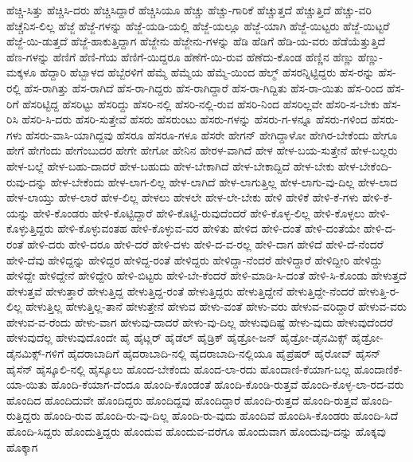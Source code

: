 {ಹೆಚ್ಚಿ-ಸಿತ್ತು
ಹೆಚ್ಚಿಸಿ-ದರು
ಹೆಚ್ಚಿಸಿದ್ದಾರೆ
ಹೆಚ್ಚಿಸಿಯೂ
ಹೆಚ್ಚು
ಹೆಚ್ಚು-ಗಾರಿಕೆ
ಹೆಚ್ಚುತ್ತದೆ
ಹೆಚ್ಚುತ್ತಿದೆ
ಹೆಚ್ಚು-ವರಿ
ಹೆಚ್ಚೆನಿಸ-ಲಿಲ್ಲ
ಹೆಜ್ಜೆ
ಹೆಜ್ಜೆ-ಗಳನ್ನು
ಹೆಜ್ಜೆ-ಯಡಿ-ಯಲ್ಲಿ
ಹೆಜ್ಜೆ-ಯಲ್ಲೂ
ಹೆಜ್ಜೆ-ಯಾಗಿ
ಹೆಜ್ಜೆ-ಯಿಟ್ಟರು
ಹೆಜ್ಜೆ-ಯಿಟ್ಟರೆ
ಹೆಜ್ಜೆ-ಯಿ-ಡುತ್ತದೆ
ಹೆಜ್ಜೆ-ಹಾಕುತ್ತಿದ್ದಾಗ
ಹೆಜ್ಜೇನು
ಹೆಜ್ಜೇನು-ಗಳನ್ನು
ಹೆಡಿ
ಹೆಡಿಗೆ
ಹೆಡಿ-ಯ-ವರು
ಹೆಡೆಯೆತ್ತುತ್ತಿದೆ
ಹೆಣ-ಗಳನ್ನು
ಹೆಣಿಗೆ
ಹೆಣಿ-ಗೆಯ
ಹೆಣಿಗೆ-ಯಿದ್ದರೂ
ಹೆಣೆಗೆ-ಯಿ-ರುವ
ಹೆಣೆದು-ಕೊಂಡ
ಹೆಣ್ಣಿನ
ಹೆಣ್ಣು
ಹೆಣ್ಣು-ಮಕ್ಕಳೂ
ಹೆದ್ದಾರಿ
ಹೆಬ್ಬಾಳದ
ಹೆಬ್ಬೆರಳಿಗೆ
ಹೆಮ್ಮೆ
ಹೆಮ್ಮೆಯ
ಹೆಮ್ಮೆ-ಯಿಂದ
ಹೆಲ್ಮ್
ಹೆಸರನ್ನಿಟ್ಟಿದ್ದರು
ಹೆಸ-ರನ್ನು
ಹೆಸ-ರಲ್ಲಿ
ಹೆಸ-ರಾಗಿತ್ತು
ಹೆಸ-ರಾಗಿದೆ
ಹೆಸ-ರಾ-ಗಿದ್ದರು
ಹೆಸ-ರಾಗಿದ್ದಾರೆ
ಹೆಸ-ರಾ-ಗಿದ್ದಿತು
ಹೆಸ-ರಾ-ಯಿತು
ಹೆಸ-ರಿಂದ
ಹೆಸ-ರಿಗೆ
ಹೆಸರಿಟ್ಟಿದ್ದ
ಹೆಸರಿಟ್ಟು
ಹೆಸರಿದ್ದು
ಹೆಸರಿ-ನಲ್ಲಿ
ಹೆಸರಿ-ನಲ್ಲಿ-ರುವ
ಹೆಸರಿ-ನಿಂದ
ಹೆಸರಿಲ್ಲವೇ
ಹೆಸರಿ-ಸ-ಬೇಕು
ಹೆಸ-ರಿಸಿ
ಹೆಸರಿ-ಸಿ-ದರು
ಹೆಸರಿ-ಸುತ್ತೇವೆ
ಹೆಸರು
ಹೆಸರುಂಟು
ಹೆಸರು-ಗಳನ್ನು
ಹೆಸರು-ಗ-ಳನ್ನೂ
ಹೆಸರು-ಗಳಿಂದ
ಹೆಸರು-ಗಳು
ಹೆಸರು-ವಾಸಿ-ಯಾಗಿದ್ದವು
ಹೆಸರೂ
ಹೆಸರೂ-ಗಳೂ
ಹೆಸರೇ
ಹೇಗನ್
ಹೇಗಿದ್ದಾಳೋ
ಹೇಗಿರ-ಬೇಕೆಂದು
ಹೇಗೂ
ಹೇಗೆ
ಹೇಗೆಂದು
ಹೇಗೆಂಬುದರ
ಹೇಗೇ
ಹೇಗೋ
ಹೇನಿನ
ಹೇರಳ-ವಾಗಿದೆ
ಹೇಳ
ಹೇಳ-ಬಯ-ಸುತ್ತೇನೆ
ಹೇಳ-ಬಲ್ಲರು
ಹೇಳ-ಬಲ್ಲೆ
ಹೇಳ-ಬಹು-ದಾದರೆ
ಹೇಳ-ಬಹುದು
ಹೇಳ-ಬೇಕಾಗಿದೆ
ಹೇಳ-ಬೇಕಾದ್ದಿದೆ
ಹೇಳ-ಬೇಕು
ಹೇಳ-ಬೇಕೆಂದಿ-ರುವು-ದನ್ನು
ಹೇಳ-ಬೇಕೆಂದು
ಹೇಳ-ಲಾಗ-ಲಿಲ್ಲ
ಹೇಳ-ಲಾಗಿದೆ
ಹೇಳ-ಲಾಗುತ್ತಿಲ್ಲ
ಹೇಳ-ಲಾಗು-ವು-ದಿಲ್ಲ
ಹೇಳ-ಲಾದ
ಹೇಳ-ಲಾಯ್ತು
ಹೇಳ-ಲಾರೆ
ಹೇಳ-ಲಿಲ್ಲ
ಹೇಳಲು
ಹೇಳಲೇ
ಹೇಳ-ಲೇ-ಬೇಕು
ಹೇಳಿ
ಹೇಳಿಕೆ
ಹೇಳಿ-ಕೆ-ಗಳು
ಹೇಳಿ-ಕೆ-ಯನ್ನು
ಹೇಳಿ-ಕೊಂಡರು
ಹೇಳಿ-ಕೊಟ್ಟಿದ್ದಾರೆ
ಹೇಳಿ-ಕೊಟ್ಟಿ-ರುವುದೆಂದರೆ
ಹೇಳಿ-ಕೊಳ್ಳ-ಲಿಲ್ಲ
ಹೇಳಿ-ಕೊಳ್ಳಲು
ಹೇಳಿ-ಕೊಳ್ಳುತ್ತಿದ್ದರು
ಹೇಳಿ-ಕೊಳ್ಳುವಂತಹ
ಹೇಳಿ-ಕೊಳ್ಳುವ-ವರ
ಹೇಳಿತು
ಹೇಳಿದ
ಹೇಳಿ-ದಂತೆ
ಹೇಳಿ-ದಂತೆಯೇ
ಹೇಳಿ-ದ-ರಂತೆ
ಹೇಳಿ-ದರು
ಹೇಳಿ-ದರೂ
ಹೇಳಿ-ದರೆ
ಹೇಳಿ-ದಳು
ಹೇಳಿ-ದ-ವ-ರಲ್ಲ
ಹೇಳಿ-ದಾಗ
ಹೇಳಿದೆ
ಹೇಳಿ-ದೆ-ನೆಂದರೆ
ಹೇಳಿ-ದೆವು
ಹೇಳಿದ್ದನ್ನು
ಹೇಳಿದ್ದರ
ಹೇಳಿದ್ದ-ರಂತೆ
ಹೇಳಿದ್ದರು
ಹೇಳಿದ್ದಾ-ನೆಂದರೆ
ಹೇಳಿದ್ದಾರೆ
ಹೇಳಿದ್ದೀರಿ
ಹೇಳಿದ್ದು
ಹೇಳಿದ್ದೇ
ಹೇಳಿದ್ದೇನೆ
ಹೇಳಿದ್ದೇರಿ
ಹೇಳಿ-ಬಿಟ್ಟರು
ಹೇಳಿ-ಬೇ-ಕೆಂದರೆ
ಹೇಳಿ-ಮಾಡಿ-ಸಿ-ದಂತೆ
ಹೇಳಿ-ಸಿ-ಕೊಂಡು
ಹೇಳುತ್ತದೆ
ಹೇಳುತ್ತವೆ
ಹೇಳುತ್ತಾರೆ
ಹೇಳುತ್ತಿದ್ದ
ಹೇಳುತ್ತಿದ್ದ-ರಂತೆ
ಹೇಳುತ್ತಿದ್ದರು
ಹೇಳುತ್ತಿದ್ದೇನೆ
ಹೇಳುತ್ತಿದ್ದೇ-ನೆಂದರೆ
ಹೇಳುತ್ತಿ-ರ-ಲಿಲ್ಲ
ಹೇಳುತ್ತಿಲ್ಲ
ಹೇಳುತ್ತಿಲ್ಲ-ತಾನೆ
ಹೇಳುತ್ತೇನೆ
ಹೇಳುವ
ಹೇಳು-ವಂತೆ
ಹೇಳು-ವರು
ಹೇಳುವ-ವರಿದ್ದಾರೆ
ಹೇಳುವ-ವರು
ಹೇಳುವ-ವ-ರೆಂದು
ಹೇಳು-ವಾಗ
ಹೇಳುವು-ದಾದರೆ
ಹೇಳು-ವು-ದಿಲ್ಲ
ಹೇಳುವುದಿಷ್ಟೆ
ಹೇಳು-ವುದು
ಹೇಳುವುದೆಂದರೆ
ಹೇಳುವುದೆಲ್ಲ
ಹೇಳುವುದೊಂದೇ
ಹೈ
ಹೈಟ್ಲರ್
ಹೈಡೆಲ್
ಹೈಡ್ರಿಕ್
ಹೈಡ್ರೋ-ಜನ್
ಹೈಡ್ರೋ-ಡೈನಮಿಕ್ಸ್
ಹೈಡ್ರೋ-ಡೈನಮಿಕ್ಸ್-ಗಳಿಗೆ
ಹೈದರಾಬಾದಿಗೆ
ಹೈದರಾಬಾದಿ-ನಲ್ಲಿ
ಹೈದರಾಬಾದಿ-ನಲ್ಲಿಯೂ
ಹೈಪ್ರೆಷರ್
ಹೈರೋವ್
ಹೈಸನ್
ಹೈಸೆನ್
ಹೈಸ್ಕೂಲಿ-ನಲ್ಲಿ
ಹೈಸ್ಕೂಲು
ಹೊಂದ-ಬೇಕೆಂದು
ಹೊಂದ-ಲಾ-ರದು
ಹೊಂದಾಣಿ-ಕೆಯಾಗ-ಬಲ್ಲ
ಹೊಂದಾಣಿಕೆ-ಯಾ-ಯಿತು
ಹೊಂದಿ-ಕೆಯಾಗ-ದೆಂದೂ
ಹೊಂದಿ-ಕೊಂಡಂತೆ
ಹೊಂದಿ-ಕೊಂಡಿ-ರುತ್ತವೆ
ಹೊಂದಿ-ಕೊಳ್ಳ-ಲಾ-ರದ-ವರು
ಹೊಂದಿದ
ಹೊಂದಿದುವೇ
ಹೊಂದಿದ್ದರು
ಹೊಂದಿದ್ದವು
ಹೊಂದಿದ್ದಾರೆ
ಹೊಂದಿ-ರುತ್ತದೆ
ಹೊಂದಿ-ರುತ್ತವೆ
ಹೊಂದಿ-ರುತ್ತಿದ್ದರು
ಹೊಂದಿ-ರುವ
ಹೊಂದಿ-ರು-ವು-ದಿಲ್ಲ
ಹೊಂದಿ-ರು-ವುದು
ಹೊಂದಿವೆ
ಹೊಂದಿಸಿ-ಕೊಂಡರು
ಹೊಂದಿ-ಸಿದೆ
ಹೊಂದಿ-ಸಿದ್ದರು
ಹೊಂದುತ್ತಿದ್ದರು
ಹೊಂದುವ
ಹೊಂದುವ-ವರೆಗೂ
ಹೊಂದುವಾಗ
ಹೊಂದುವು-ದನ್ನು
ಹೊಕ್ಕವು
ಹೊಕ್ಕಾಗ
}
